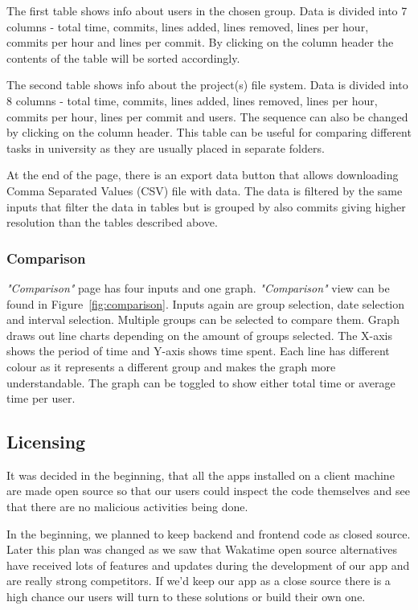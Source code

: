 The first table shows info about users in the chosen group.
Data is divided into 7 columns - total time, commits, lines added, lines removed, lines per hour, commits per hour and lines per commit.
By clicking on the column header the contents of the table will be sorted accordingly.

The second table shows info about the project(s) file system.
Data is divided into 8 columns - total time, commits, lines added, lines removed, lines per hour, commits per hour, lines per commit and users.
The sequence can also be changed by clicking on the column header.
This table can be useful for comparing different tasks in university as they are usually placed in separate folders.

At the end of the page, there is an export data button that allows downloading Comma Separated Values (CSV) file with data.
The data is filtered by the same inputs that filter the data in tables but is grouped
by also commits giving higher resolution than the tables described above.


\subsubsection{Comparison}\label{subsubsec:comparison}
\textit{"Comparison"} page has four inputs and one graph.
\textit{"Comparison"} view can be found in Figure~\ref{fig:comparison}.
Inputs again are group selection, date selection and interval selection.
Multiple groups can be selected to compare them.
Graph draws out line charts depending on the amount of groups selected.
The X-axis shows the period of time and Y-axis shows time spent.
Each line has different colour as it represents a different group and makes the graph more understandable.
The graph can be toggled to show either total time or average time per user.

\subsection{Licensing}\label{subsec:licencing}
It was decided in the beginning, that all the apps installed on a client machine are made open source so that
our users could inspect the code themselves and see that there are no malicious activities being done.

In the beginning, we planned to keep backend and frontend code as closed source.
Later this plan was changed as we saw that Wakatime open source alternatives have received lots of features and updates
during the development of our app and are really strong competitors.
If we'd keep our app as a close source there is a high chance our users will turn to these solutions or build their own one.

